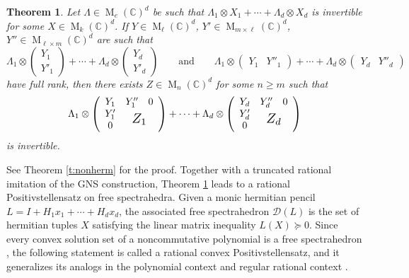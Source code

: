 \documentclass[12pt,a4paper]{amsart}
\DeclareMathOperator{\opm}{M}
\newcommand{\C}{\mathbb{C}}
\newcommand{\cD}{\mathcal{D}}
\newcommand*{\mathlarger}[1]{\scalebox{1.35}{$#1$}}
\newcommand*{\mat}[1]{\opm_{#1}(\C)}
\newtheorem{thmA}{Theorem}
\theoremstyle{definition}
\theoremstyle{remark}
\numberwithin{equation}{section}
\begin{document}
\begin{thmA}\label{ta:1}
Let $\Lambda\in\mat{e}^d$ be such that $\Lambda_1\otimes X_1+\cdots+\Lambda_d\otimes X_d$ is invertible for some $X\in\mat{k}^d$. 
If $Y\in\mat{\ell}^d$, $Y'\in\mat{m\times \ell}^d$, $Y''\in\mat{\ell\times m}^d$ are such that
$$
\Lambda_1\otimes \begin{pmatrix} Y_1 \\ Y'_1\end{pmatrix}+\cdots+
\Lambda_d\otimes \begin{pmatrix} Y_d \\ Y'_d\end{pmatrix}
\qquad\text{and}\qquad
\Lambda_1\otimes \begin{pmatrix} Y_1 & Y''_1\end{pmatrix}+\cdots+
\Lambda_d\otimes \begin{pmatrix} Y_d & Y''_d\end{pmatrix}
$$
have full rank, then there exists $Z\in\mat{n}^d$ for some $n\ge m$ such that
$$
\Lambda_1\otimes \left(\begin{array}{cc}
Y_1 & \begin{matrix} Y''_1 & 0\end{matrix} \\
\begin{matrix} Y'_1 \\ 0\end{matrix} & \mathlarger{Z_1}
\end{array}\right)
+\cdots+
\Lambda_d\otimes \left(\begin{array}{cc}
Y_d & \begin{matrix} Y''_d & 0\end{matrix} \\
\begin{matrix} Y'_d \\ 0\end{matrix} & \mathlarger{Z_d}
\end{array}\right)
$$
is invertible.
\end{thmA}

See Theorem \ref{t:nonherm} for the proof. Together with a truncated rational imitation of the GNS construction, Theorem \ref{ta:1} leads to a rational Positivstellensatz on free spectrahedra. Given a monic hermitian pencil $L=I+H_1x_1+\cdots +H_dx_d$, the associated free spectrahedron $\cD(L)$ is the set of hermitian tuples $X$ satisfying the linear matrix inequality $L(X)\succeq0$. Since every convex solution set of a noncommutative polynomial is a free spectrahedron \cite{HM1}, the following statement is called a rational convex Positivstellensatz, and it generalizes its analogs in the polynomial context \cite{HKM} and regular rational context \cite{Pas}.
\end{document}
